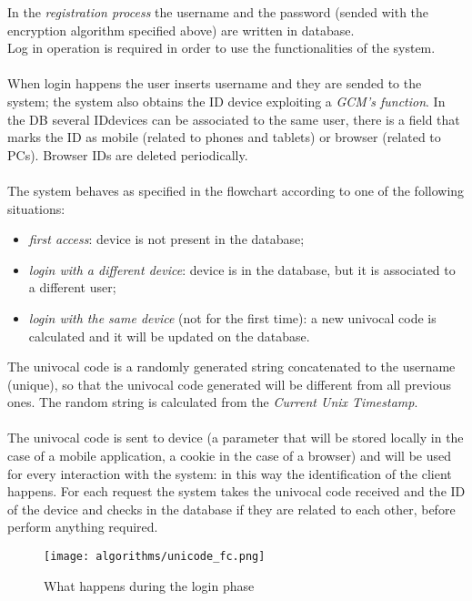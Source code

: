 In the \textit{registration process} the username and the password (sended with the encryption algorithm specified above) are written in database.\\
Log in operation is required in order to use the functionalities of the system.
\\\\
When login happens the user inserts username and they are sended to the system; the system also obtains the ID device exploiting a \textit{GCM's function}. In the DB several IDdevices can be associated to the same user, there is a field that marks the ID as mobile (related to phones and tablets) or browser (related to PCs). Browser IDs are deleted periodically. 
\\\\
The system behaves as specified in the flowchart according to one of the following situations:
\begin{itemize}
\item \textit{first access}: device is not present in the database;
\item \textit{login with a different device}: device is in the database, but it is associated to a different user;
\item \textit{login with the same device} (not for the first time): a new univocal code is calculated and it will be updated on the database.
\end{itemize}
The univocal code is a randomly generated string concatenated to the username (unique), so that the univocal code generated will be different from all previous ones. The random string is calculated from the \textit{Current Unix Timestamp}.
\\\\
The univocal code is sent to device (a parameter that will be stored locally in the case of a mobile application, a cookie in the case of a browser) and will be used for every interaction with the system: in this way the identification of the client happens. For each request the system takes the univocal code received and the ID of the device and checks in the database if they are related to each other, before perform anything required. 
\\
\begin{figure}
	\texttt{[image: algorithms/unicode\_fc.png]}
	\centering
	\caption{What happens during the login phase}
\end{figure}
